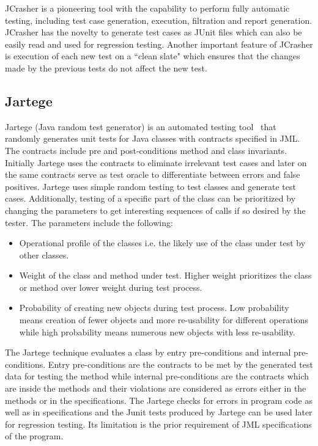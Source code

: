 JCrasher is a pioneering tool with the capability to perform fully automatic testing, including test case generation, execution, filtration and report generation. JCrasher has the novelty to generate test cases as JUnit files which can also be easily read and used for regression testing. Another important feature of JCrasher is execution of each new test on a ``clean slate" which ensures that the changes made by the previous tests do not affect the new test.  



\subsection{Jartege} \label{jartege_2}
Jartege (Java random test generator) is an automated testing tool~\cite{oriat2005jartege} that randomly generates unit tests for Java classes with contracts specified in JML. The contracts include pre and post-conditions method and class invariants. Initially Jartege uses the contracts to eliminate irrelevant test cases and later on the same contracts serve as test oracle to differentiate between errors and false positives. Jartege uses simple random testing to test classes and generate test cases. Additionally, testing of a specific part of the class can be prioritized by changing the parameters to get interesting sequences of calls if so desired by the tester. The parameters include the following: 

\begin{itemize}
\item Operational profile of the classes i.e. the likely use of the class under test by other classes.  
\item Weight of the class and method under test. Higher weight prioritizes the class or method over lower weight during test process. 
\item Probability of creating new objects during test process. Low probability means creation of fewer objects and more re-usability for different operations while high probability means numerous new objects with less re-usability.
\end{itemize}

The Jartege technique evaluates a class by entry pre-conditions and internal pre-conditions. Entry pre-conditions are the contracts to be met by the generated test data for testing the method while internal pre-conditions are the contracts which are inside the methods and their violations are considered as errors either in the methods or in the specifications. The Jartege checks for errors in program code as well as in specifications and the Junit tests produced by Jartege can be used later for regression testing. Its limitation is the prior requirement of JML specifications of the program.

